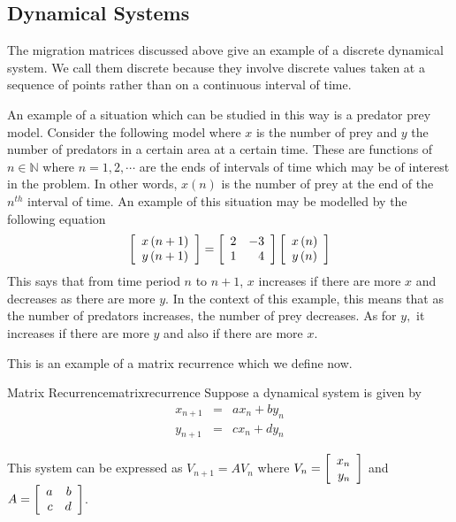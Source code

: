 \subsection{Dynamical Systems}

The migration matrices discussed above give an example of a discrete
dynamical system. We call them discrete because they involve discrete values taken at a sequence of
points rather than on a continuous interval of time. 

An example of a situation
which can be studied in this way is a predator prey model. Consider the
following model where $x$ is the number of prey and $y$ the number of
predators in a certain area at a certain time. These are functions of $n\in \mathbb{N}$ where $n=1,2,\cdots $ are
the ends of intervals of time which may be of interest in the problem. In other words, $x \left( n \right)$ is the number 
of prey at the end of the $n^{th}$ interval of time.
An example of this situation may be modelled by the following equation
\begin{equation*}
\left[
\begin{array}{c}
x\left( n+1\right) \\
y\left( n+1\right)
\end{array}
\right] =\left[
\begin{array}{rr}
2 & -3 \\
1 & 4
\end{array}
\right] \left[
\begin{array}{c}
x\left( n\right) \\
y\left( n\right)
\end{array}
\right]
\end{equation*}
This says that from time period $n$ to $n+1$, $x$ increases if there are more $x$ and decreases as there
are more $y$. In the context of this example, this means that as the number of predators increases,
the number of prey decreases. As for $y,$ it increases if there are more $y$ and also if
there are more $x$.

This is an example of a matrix recurrence which we define now. 

\begin{definition}{Matrix Recurrence}{matrixrecurrence}
Suppose a dynamical system is given by  
\begin{eqnarray*}
x_{n+1} &=& a x_n + b y_n \\
y_{n+1} &=& c x_n + d y_n
\end{eqnarray*}

This system can be expressed as $V_{n+1} = A V_{n}$ where $V_{n} = \left[ \begin{array}{r}
x_n \\
y_n
\end{array}
\right]$ and $A = \left[ \begin{array}{rr}
a & b \\
c & d 
\end{array} \right]$.  
\end{definition}

